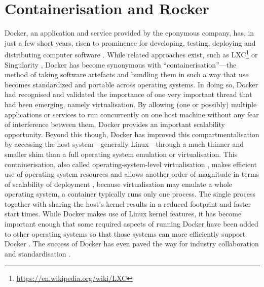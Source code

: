 \hypertarget{containerisation-and-rocker}{%
\section{Containerisation and
Rocker}\label{containerisation-and-rocker}}

\label{containerisation} \label{rocker}

Docker, an application and service provided by the eponymous company,
has, in just a few short years, risen to prominence for developing,
testing, deploying and distributing computer software
\citep[cf.][]{datadog_8_2018,munoz_history_2019}. While related
approaches exist, such as
LXC\footnote{\href{https://en.wikipedia.org/wiki/LXC}{https://en.wikipedia.org/wiki/LXC}}
or Singularity \citep{kurtzer_singularity_2017}, Docker has become
synonymous with ``containerisation''---the method of taking software
artefacts and bundling them in such a way that use becomes standardized
and portable across operating systems. In doing so, Docker had
recognised and validated the importance of one very important thread
that had been emerging, namely virtualisation. By allowing (one or
possibly) multiple applications or services to run concurrently on one
host machine without any fear of interference between them, Docker
provides an important scalability opportunity. Beyond this though,
Docker has improved this compartmentalisation by accessing the host
system---generally Linux---through a much thinner and smaller shim than
a full operating system emulation or virtualisation. This
containerisation, also called operating-system-level virtualisation
\citep{wikipedia_contributors_os-level_2020}, makes efficient use of
operating system resources \citep{felter_updated_2015} and allows
another order of magnitude in terms of scalability of deployment
\citep[cf.][]{datadog_8_2018}, because virtualisation may emulate a
whole operating system, a container typically runs only one process. The
single process together with sharing the host's kernel results in a
reduced footprint and faster start times. While Docker makes use of
Linux kernel features, it has become important enough that some required
aspects of running Docker have been added to other operating systems so
that those systems can more efficiently support Docker
\citep{microsoft_linux_2019}. The success of Docker has even paved the
way for industry collaboration and standardisation
\citep{oci_open_2019}.

